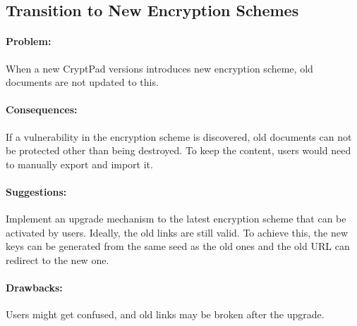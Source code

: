 \subsection{Transition to New Encryption Schemes}

\paragraph{Problem:}
When a new CryptPad versions introduces new encryption scheme, old documents are not updated to this.

\paragraph{Consequences:}
If a vulnerability in the encryption scheme is discovered, old documents can not be protected other than being destroyed. To keep the content, users would need to manually export and import it.

\paragraph{Suggestions:}
Implement an upgrade mechanism to the latest encryption scheme that can be activated by users.
Ideally, the old links are still valid.
To achieve this, the new keys can be generated from the same seed as the old ones and the old URL can redirect to the new one.

\paragraph{Drawbacks:}
Users might get confused, and old links may be broken after the upgrade.
